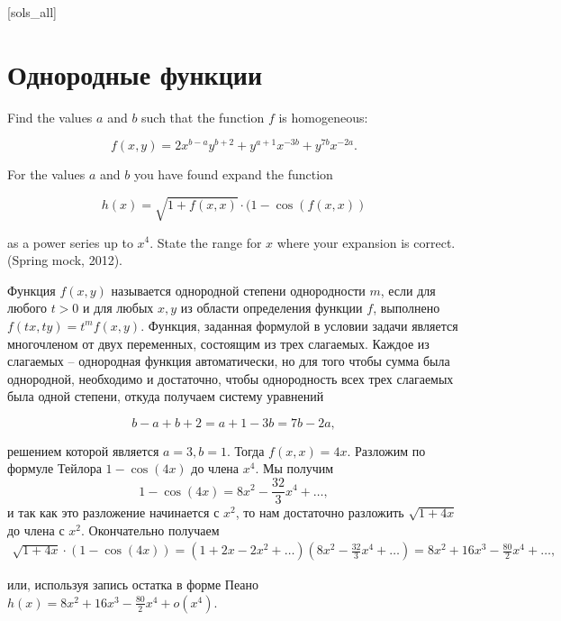 [sols_all]

\section{Однородные функции}

\begin{problem}
Find the values $a$ and $b$ such that the function $f$ is homogeneous:

\[f(x,y)=2x^{b-a} y^{b+2} +y^{a+1} x^{-3b} +y^{7b} x^{-2a} .\]

For the values $a$ and $b$ you have found expand the function

\[h(x)=\sqrt{1+f(x,x)} \cdot (1-\cos (f(x,x))\]

as a power series up to $x^{4} $. State the range for $x$ where your expansion is correct. (Spring mock, 2012).



\begin{sol}
Функция $f(x,y)$ называется однородной степени однородности $m$, если для любого $t>0$ и для любых $x,y$ из области определения функции $f$, выполнено $f(tx,ty)=t^{m} f(x,y)$. Функция, заданная формулой в условии задачи является многочленом от двух переменных, состоящим из трех слагаемых. Каждое из слагаемых -- однородная функция автоматически, но для того чтобы сумма была однородной, необходимо и достаточно, чтобы однородность всех трех слагаемых была одной степени, откуда получаем систему уравнений

\[b-a+b+2=a+1-3b=7b-2a,\]

решением которой является $a=3,  b=1$. Тогда $f(x,x)=4x$. Разложим по формуле Тейлора $1-\cos (4x)$ до члена $x^{4} $. Мы получим
\[
1-\cos (4x)=8x^{2} -\frac{32}{3} x^{4} +\ldots,
\]
и так как это разложение начинается с $x^{2} $, то нам достаточно разложить $\sqrt{1+4x} $ до члена с $x^{2} $. Окончательно получаем
\begin{multline}
\sqrt{1+4x} \cdot (1-\cos (4x))=(1+2x-2x^{2} +\ldots )(8x^{2} -\frac{32}{3} x^{4} + \ldots )=8x^{2} +16x^{3} -\frac{80}{2} x^{4} +\ldots,
\end{multline}

или, используя запись остатка в форме Пеано $h(x)=8x^{2} +16x^{3} -\frac{80}{2} x^{4} +o(x^{4} )$.
\end{sol}
\end{problem} 


